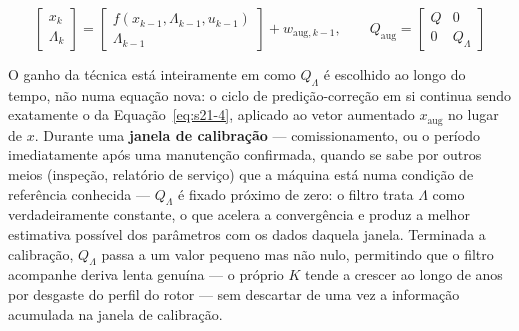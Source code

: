 \documentclass[12pt,a4paper]{article}
\numberwithin{equation}{section}
\numberwithin{table}{section}
\numberwithin{figure}{section}
\begin{document}
{\begin{equation}\label{eq:s28-2}
\begin{bmatrix} x_k \\ \Lambda_k \end{bmatrix} = \begin{bmatrix} f(x_{k-1}, \Lambda_{k-1}, u_{k-1}) \\ \Lambda_{k-1} \end{bmatrix} + w_{\text{aug},k-1}, \qquad Q_{\text{aug}} = \begin{bmatrix} Q & 0 \\ 0 & Q_\Lambda \end{bmatrix}
\end{equation}

O ganho da técnica está inteiramente em como $Q_\Lambda$ é escolhido ao longo do tempo, não numa equação nova: o ciclo de predição-correção em si continua sendo exatamente o da Equação~\eqref{eq:s21-4}, aplicado ao vetor aumentado $x_{\text{aug}}$ no lugar de $x$. Durante uma \textbf{janela de calibração} — comissionamento, ou o período imediatamente após uma manutenção confirmada, quando se sabe por outros meios (inspeção, relatório de serviço) que a máquina está numa condição de referência conhecida — $Q_\Lambda$ é fixado próximo de zero: o filtro trata $\Lambda$ como verdadeiramente constante, o que acelera a convergência e produz a melhor estimativa possível dos parâmetros com os dados daquela janela. Terminada a calibração, $Q_\Lambda$ passa a um valor pequeno mas não nulo, permitindo que o filtro acompanhe deriva lenta genuína — o próprio $K$ tende a crescer ao longo de anos por desgaste do perfil do rotor — sem descartar de uma vez a informação acumulada na janela de calibração.

}
\end{document}
